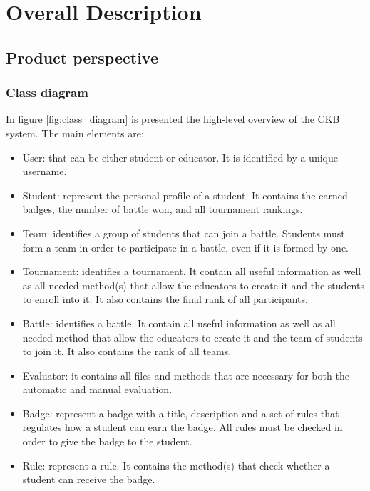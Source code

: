 \chapter{Overall Description}

\section{Product perspective}
\subsection{Class diagram}
In figure \ref{fig:class_diagram} is presented the high-level overview of the CKB system. \newline
The main elements are:
\begin{itemize}
    \item User: that can be either student or educator. It is identified by a unique username.
    \item Student: represent the personal profile of a student. It contains the earned badges, the number of battle won, and all tournament rankings.
    \item Team: identifies a group of students that can join a battle. Students must form a team in order to participate in a battle, even if it is formed by one.
    \item Tournament: identifies a tournament. It contain all useful information as well as all needed method(s) that allow the educators to create it and the students to enroll into it. It also contains the final rank of all participants.
    \item Battle: identifies a battle. It contain all useful information as well as all needed method that allow the educators to create it and the team of students to join it. It also contains the rank of all teams.
    \item Evaluator: it contains all files and methods that are necessary for both the automatic and manual evaluation.
    \item Badge: represent a badge with a title, description and a set of rules that regulates how a student can earn the badge. All rules must be checked in order to give the badge to the student.
    \item Rule: represent a rule. It contains the method(s) that check whether a student can receive the badge.
\end{itemize}

